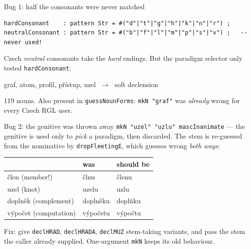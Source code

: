 \documentclass[10pt,aspectratio=169]{beamer}
\newcommand{\bad}[1]{\textcolor{warn}{#1}}
\newcommand{\ok}[1]{\textcolor{good}{#1}}
\begin{document}
\begin{frame}[fragile]{Bug 1: half the consonants were never matched}
\begin{lstlisting}
hardConsonant    : pattern Str = #("d"|"t"|"g"|"h"|"k"|"n"|"r") ;
neutralConsonant : pattern Str = #("b"|"f"|"l"|"m"|"p"|"s"|"v") ;   -- never used!
\end{lstlisting}

  Czech \emph{neutral} consonants take the \emph{hard} endings.
  But the paradigm selector only tested \texttt{hardConsonant}:

  \vspace{0.5em}
  \begin{center}
  \bad{graf, atom, profil, přístup, uzel} $\;\longrightarrow\;$ soft declension
  \end{center}

  \vspace{0.5em}
  119 nouns. Also present in \texttt{guessNounForms}: \texttt{mkN "graf"} was
  \emph{already} wrong for every Czech RGL user.
\end{frame}

\begin{frame}[fragile]{Bug 2: the genitive was thrown away}
  \texttt{mkN "uzel" "uzlu" mascInanimate} --- the genitive is used only to
  \emph{pick} a paradigm, then discarded. The stem is re-guessed from the
  nominative by \texttt{dropFleetingE}, which guesses wrong \emph{both ways}:

  \vspace{0.5em}
  \begin{center}
  \begin{tabular}{lll}
    \toprule
    & \textbf{was} & \textbf{should be} \\
    \midrule
    člen (member!) & \bad{člnu}      & \ok{členu} \\
    uzel (knot)    & \bad{uzelu}     & \ok{uzlu} \\
    doplněk (complement) & \bad{doplněku} & \ok{doplňku} \\
    výpočet (computation) & \bad{výpočetu} & \ok{výpočtu} \\
    \bottomrule
  \end{tabular}
  \end{center}

  \vspace{0.5em}
  \ok{Fix}: give \texttt{declHRAD}, \texttt{declHRADA}, \texttt{declMUZ}
  stem-taking variants, and pass the stem the caller already supplied.
  One-argument \texttt{mkN} keeps its old behaviour.
\end{frame}
\end{document}
